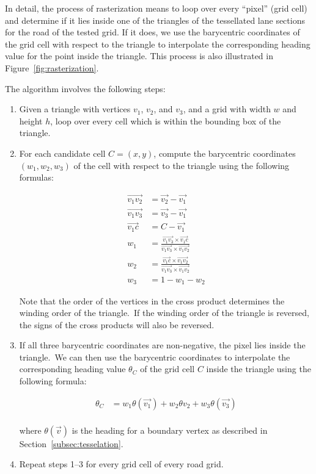 In detail, the process of rasterization means to loop over every \enquote{pixel} (grid cell) and determine if it lies inside one of the triangles of the tessellated lane sections for the road of the tested grid.
If it does, we use the barycentric coordinates of the grid cell with respect to the triangle to interpolate the corresponding heading value for the point inside the triangle.
This process is also illustrated in Figure~\ref{fig:rasterization}.

The algorithm involves the following steps:

\begin{enumerate}
    \item Given a triangle with vertices $v_1$, $v_2$, and $v_3$, and a grid with width $w$ and height $h$, loop over every cell which is within the bounding box of the triangle.
    \item For each candidate cell $C=(x,y)$, compute the barycentric coordinates $(w_1, w_2, w_3)$ of the cell with respect to the triangle using the following formulas:

    \[
    \begin{aligned}
    \vec{v_1v_2} &= \vec{v_2} - \vec{v_1} \\
    \vec{v_1v_3} &= \vec{v_3} - \vec{v_1} \\
    \vec{v_1c} &= C - \vec{v_1} \\
    w_1 &= \frac{\vec{v_1v_3} \times \vec{v_1c}}{\vec{v_1v_3} \times \vec{v_1v_2}} \\
    w_2 &= \frac{\vec{v_1c} \times \vec{v_1v_2}}{\vec{v_1v_3} \times \vec{v_1v_2}} \\
    w_3 &= 1 - w_1 - w_2
    \end{aligned}
    \]

    Note that the order of the vertices in the cross product determines the winding order of the triangle.\ If the winding order of the triangle is reversed, the signs of the cross products will also be reversed.

    \item If all three barycentric coordinates are non-negative, the pixel lies inside the triangle.\ We can then use the barycentric coordinates to interpolate the corresponding heading value $\theta_C$ of the grid cell $C$ inside the triangle using the following formula:

    \[
    \begin{aligned}
    \theta_C &= w_1 \theta(\vec{v_1}) + w_2 \theta{v_2} + w_3 \theta(\vec{v_3}) \\
    \end{aligned}
    \]

    where $\theta(\vec{v})$ is the heading for a boundary vertex as described in Section~\ref{subsec:tesselation}.

    \item Repeat steps 1--3 for every grid cell of every road grid.

\end{enumerate}

